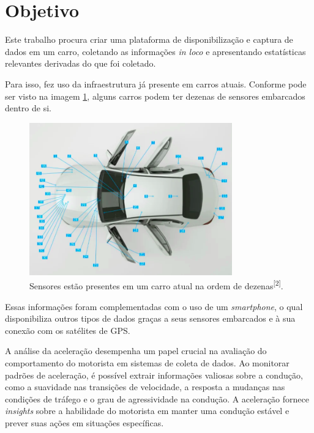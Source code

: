 \section{Objetivo}

Este trabalho procura criar uma plataforma de disponibilização e captura de dados em um carro, coletando as informações \textit{in loco} e apresentando estatísticas relevantes derivadas do que foi coletado.

Para isso, fez uso da infraestrutura já presente em carros atuais. Conforme pode ser visto na imagem \ref{fig:sensors_car}, alguns carros podem ter dezenas de sensores embarcados dentro de si.


\begin{figure}[hp]
    \centering
    
    \includegraphics[]{figures/sensores_carro.png}
    
    \caption{Sensores estão presentes em um carro atual na ordem de dezenas\textsuperscript{[2]}.}
    
    \label{fig:sensors_car}
\end{figure}

Essas informações foram complementadas com o uso de um \textit{smartphone}, o qual disponibiliza outros tipos de dados graças a seus sensores embarcados e à sua conexão com os satélites de GPS.

A análise da aceleração desempenha um papel crucial na avaliação do comportamento do motorista em sistemas de coleta de dados. Ao monitorar padrões de aceleração, é possível extrair informações valiosas sobre a condução, como a suavidade nas transições de velocidade, a resposta a mudanças nas condições de tráfego e o grau de agressividade na condução. A aceleração fornece \textit{insights} sobre a habilidade do motorista em manter uma condução estável e prever suas ações em situações específicas. 

